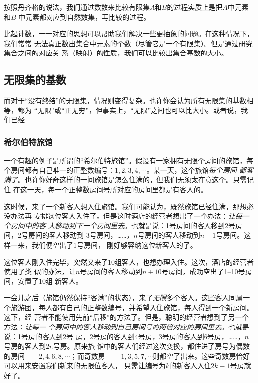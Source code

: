 按照丹齐格的说法，我们通过数数来比较有限集$A$和$B$的过程实质上是把$A$中元素和$B$
中元素都对应到自然数集，再比较的过程。

比起计数，一一对应的思想可以帮助我们解决一些更抽象的问题。在这种情况下，我们常常
无法真正数出集合中元素的个数（尽管它是一个有限集）。但是通过研究集合之间的对应关
系（映射）的性质，我们可以比较出集合基数的大小。

\subsection{无限集的基数}

而对于“没有终结”的无限集，情况则变得复杂。也许你会认为所有无限集的基数相等，都为
“无限”或“正无穷”，但事实上，“无限”之间也可以比大小。或者说，我们已经

\subsubsection{希尔伯特旅馆}

一个有趣的例子是所谓的“希尔伯特旅馆”。假设有一家拥有无限个房间的旅馆，每
个房间都有自己唯一的正整数编号：$1,2,3,4,\cdots $。某一天，这个旅馆\emph{每个房间
都客满了}。也许你好奇这样的一间旅馆是怎么住满的，但我们无须太在意这个。只需记住
在这一天，每一个正整数房间号所对应的房间里都是有客人的。

这时候，来了一个新客人想入住旅馆。我们可能认为，既然旅馆已经住满，那想必没办法再
安排这位客人入住了。但是这时酒店的经营者想出了一个办法：\emph{让每一个房间中的客
人移动到下一个房间里去}。也就是说：1号房间的客人移到2号房间，2号房间的客人移动到
3号房间，……，$n$号房间的客人移动到$n+1$号房间。这样一来，我们便空出了1号房间，
刚好够容纳这位新客人的了。

这位客人刚入住完毕，突然又来了10组客人，也想办理入住。这次，酒店的经营者使用了类
似的办法，让$n$号房间的客人移动到$n+10$号房间，成功空出了1--10号房间，安置了10组
新客人。

一会儿之后（旅馆仍然保持“客满”的状态），来了\emph{无限}多个客人。这些客人同属一
个旅游团，每人都有自己的正整数编号，并希望入住旅馆，每人得到一个新房间。这下，经
营者不能使用先前“后移”的方法了。但是，聪明的经营者想到了另一个方法：\emph{让每一
个房间中的客人移动到自己房间号的两倍对应的房间里去}。也就是说：1号房的客人到2号
房，2号房的客人到4号房，3号房的客人到6号房，……，$n$号房的客人到$2n$号房。原来旅
馆中的客人们经过这次变换，都住进了房号为偶数的房间——$2,4,6,8,\cdots $；而奇数房
——$1,3,5,7,\cdots $则都空了出来。这些奇数房恰好可以用来安置我们新来的无限位客人，
只需让编号为$k$的新客人入住$2k-1$号房就好了。

